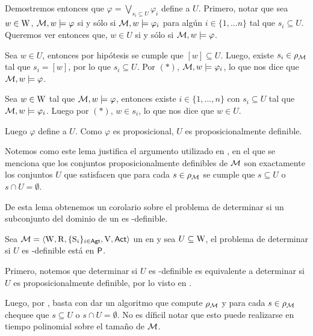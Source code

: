 \begin{demostracion}
    Demostremos entonces que $\varphi = \bigvee\limits_{s_i \subseteq U}\varphi_i$ define a $U$. Primero, notar que sea $w \in \mathrm{W}$, 
    $\mathcal{M}, w \models \varphi$ si y sólo si $\mathcal{M}, w \models \varphi_i$ para algún $i \in \{1,...n\}$ tal que $s_i \subseteq U$.  
    Queremos ver entonces que, $w \in U$ si y sólo si $\mathcal{M}, w \models \varphi$. 

    Sea $w \in U$, entonces por hipótesis se cumple que $[w] \subseteq U$. Luego, existe $s_i \in \rho_{\mathcal{M}}$ tal que 
    $s_i = [w]$, por lo que $s_i \subseteq U$. Por $(*)$, $\mathcal{M}, w \models \varphi_i$, lo que nos dice que $\mathcal{M}, w \models \varphi$.

    Sea $w \in \mathrm{W}$ tal que $\mathcal{M}, w \models \varphi$, entonces existe $i \in \{1,...,n\}$ con $s_i \subseteq U$ tal que $\mathcal{M}, w \models \varphi_i$. 
    Luego por $(*)$, $w \in s_i$, lo que nos dice que $w \in U$.

    Luego $\varphi$ define a $U$. Como $\varphi$ es proposicional, $U$ es proposicionalmente definible.
\end{demostracion}

Notemos como este lema justifica el argumento utilizado en , en el que se menciona que los conjuntos proposicionalmente 
definibles de $\mathcal{M}$ son exactamente los conjuntos $U$ que satisfacen que para cada $s \in \rho_{\mathcal{M}}$ se cumple que 
$s \subseteq U$ o $s \cap U = \emptyset$.

De esta lema obtenemos un corolario sobre el problema de determinar si un subconjunto del dominio de un \ults es \KHilogic-definible.

\begin{corolario}
    Sea $\mathcal{M}=\langle \mathrm{W},\mathrm{R},\{ \mathrm{S}_i \}_{i \in {\rm \sf Agt}},\mathrm{V},{\rm \sf Act} \rangle$ un \ults en \MFD y sea $U \subseteq \mathrm{W}$, el problema de determinar si $U$ es 
    \KHilogic-definible está en $\rm\textsf{P}$.
\end{corolario}

\begin{demostracion}

    Primero, notemos que determinar si $U$ es \KHilogic-definible es equivalente a determinar si $U$ es proposicionalmente definible, por lo visto en 
    .

    Luego, por , basta con dar un algoritmo que compute $\rho_{\mathcal{M}}$ y 
    para cada $s \in \rho_{\mathcal{M}}$ chequee que $s \subseteq U$ o $s \cap U = \emptyset$. No es díficil notar que esto 
    puede realizarse en tiempo polinomial sobre el tamaño de $\mathcal{M}$.
\end{demostracion}

